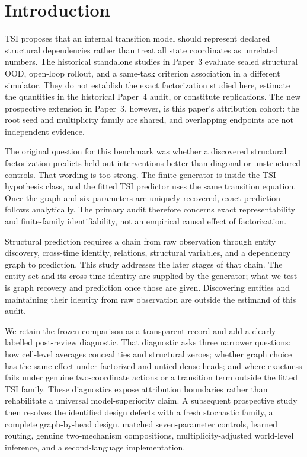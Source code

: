 \section{Introduction}

TSI proposes that an internal transition model should represent declared
structural dependencies rather than treat all state coordinates as unrelated
numbers.  The historical standalone studies in Paper~3 evaluate sealed
structural OOD, open-loop rollout, and a same-task criterion association in a
different simulator.  They do not establish the exact factorization studied
here, estimate the quantities in the historical Paper~4 audit, or constitute
replications.  The new prospective extension in Paper~3, however, is this
paper's attribution cohort: the root seed and multiplicity family are shared,
and overlapping endpoints are not independent evidence.

The original question for this benchmark was whether a discovered structural
factorization predicts held-out interventions better than diagonal or
unstructured controls.  That wording is too strong.  The finite generator is
inside the TSI hypothesis class, and the fitted TSI predictor uses the same
transition equation.  Once the graph and six parameters are uniquely recovered,
exact prediction follows analytically.  The primary audit therefore concerns
exact representability and finite-family identifiability, not an empirical
causal effect of factorization.

Structural prediction requires a chain from raw observation through entity
discovery, cross-time identity, relations, structural variables, and a
dependency graph to prediction. This study addresses the later stages of that
chain. The entity set and its cross-time identity are supplied by the generator;
what we test is graph recovery and prediction once those are given. Discovering
entities and maintaining their identity from raw observation are outside the
estimand of this audit.

We retain the frozen comparison as a transparent record and add a clearly
labelled post-review diagnostic.  That diagnostic asks three narrower questions:
how cell-level averages conceal ties and structural zeroes; whether graph choice
has the same effect under factorized and untied dense heads; and where exactness
fails under genuine two-coordinate actions or a transition term outside the
fitted TSI family.  These diagnostics expose attribution boundaries rather than
rehabilitate a universal model-superiority claim.  A subsequent prospective
study then resolves the identified design defects with a fresh stochastic
family, a complete graph-by-head design, matched seven-parameter controls,
learned routing, genuine two-mechanism compositions, multiplicity-adjusted
world-level inference, and a second-language implementation.
